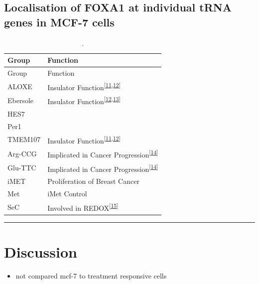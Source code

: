 \documentclass[
  12pt,
]{article}
\providecommand{\tightlist}{%
  \setlength{\itemsep}{0pt}\setlength{\parskip}{0pt}}
\begin{document}
\hypertarget{localisation-of-foxa1-at-individual-trna-genes-in-mcf-7-cells}{%
\subsection{Localisation of FOXA1 at individual tRNA genes in MCF-7 cells}\label{localisation-of-foxa1-at-individual-trna-genes-in-mcf-7-cells}}

\begin{longtable}[]{@{}ll@{}}
\caption{\label{tab:clusters}.}\tabularnewline
\toprule()
Group & Function \\
\midrule()
\endfirsthead
\toprule()
Group & Function \\
\midrule()
\endhead
ALOXE & Insulator Function\textsuperscript{{[}\protect\hyperlink{ref-raab2011}{11},\protect\hyperlink{ref-sizer2022}{12}{]}} \\
Ebersole & Insulator Function\textsuperscript{{[}\protect\hyperlink{ref-sizer2022}{12},\protect\hyperlink{ref-Ebersole2011}{13}{]}} \\
HES7 & \\
Per1 & \\
TMEM107 & Insulator Function\textsuperscript{{[}\protect\hyperlink{ref-raab2011}{11},\protect\hyperlink{ref-sizer2022}{12}{]}} \\
Arg-CCG & Implicated in Cancer Progression\textsuperscript{{[}\protect\hyperlink{ref-Goodarzi2016}{14}{]}} \\
Glu-TTC & Implicated in Cancer Progression\textsuperscript{{[}\protect\hyperlink{ref-Goodarzi2016}{14}{]}} \\
iMET & Proliferation of Breast Cancer \\
Met & iMet Control \\
SeC & Involved in REDOX\textsuperscript{{[}\protect\hyperlink{ref-Sangha2022}{15}{]}} \\
\bottomrule()
\end{longtable}

\begin{center}\rule{0.5\linewidth}{0.5pt}\end{center}

\hypertarget{discussion}{%
\section{Discussion}\label{discussion}}

\begin{itemize}
\tightlist
\item
  not compared mcf-7 to treatment responsive cells
\end{itemize}
\end{document}
